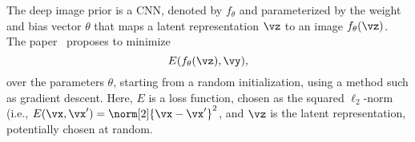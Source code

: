 \documentclass{article}
\newcommand{\rhcomment}[1]{{\color{blue} [RH: #1]}}
\begin{document}

The deep image prior is a CNN, denoted by $f_\theta$ and parameterized by the weight and bias vector $\theta$ that maps a latent representation $\vz$ to an image $f_\theta(\vz)$. 
The paper~\cite{DeepImagePrior} proposes to minimize
\[
E(f_\theta(\vz), \vy),
\]
over the parameters $\theta$, starting from a random initialization, using a method such as gradient descent. 
Here, $E$ is a loss function, chosen as the squared $\ell_2$-norm (i.e., $E(\vx, \vx') = \norm[2]{\vx - \vx'}^2$, and $\vz$ is the latent representation, potentially chosen at random. 
\end{document}
